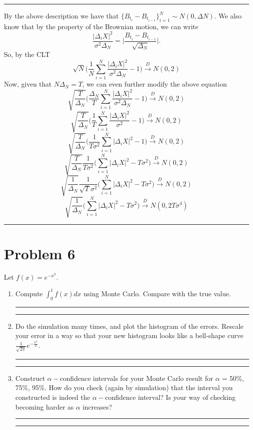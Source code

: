 \documentclass{article} %
\begin{document}
\rule{\textwidth}{1pt}
By the above description we have that $\{B_{t_i} - B_{t_{i-1}} \}_{i=1}^N \sim N(0, \Delta N)$. We also know that by the property of the Brownian motion, we can write 
\[ \frac{|\Delta_i X|^2}{\sigma^2\Delta_N} = \Bigg|\frac{B_{t_i}-B_{t_{i-1}}}{\sqrt{\Delta_N}}\Bigg|.   \]
So, by the CLT
\[  \sqrt{N} \Bigg( \frac{1}{N} \sum_{i=1}^N \frac{|\Delta_i X|^2}{\sigma^2\Delta_N} -1  \Bigg)\xrightarrow[]{D} N(0,2)    \]
Now, given that $N\Delta_N=T$, we can even further modify the above equation
\[  \sqrt{\frac{T}{\Delta_N}} \Bigg( \frac{\Delta_N}{T} \sum_{i=1}^N \frac{|\Delta_i X|^2}{\sigma^2\Delta_N} -1  \Bigg)\xrightarrow[]{D} N(0,2)    \]
\[  \sqrt{\frac{T}{\Delta_N}} \Bigg( \frac{1}{T} \sum_{i=1}^N \frac{|\Delta_i X|^2}{\sigma^2} -1  \Bigg)\xrightarrow[]{D} N(0,2)    \]
\[  \sqrt{\frac{T}{\Delta_N}} \Bigg( \frac{1}{T\sigma^2} \sum_{i=1}^N |\Delta_i X|^2 -1  \Bigg)\xrightarrow[]{D} N(0,2)    \]
\[  \sqrt{\frac{T}{\Delta_N}}  \frac{1}{T\sigma^2} \Bigg( \sum_{i=1}^N |\Delta_i X|^2 -T\sigma^2  \Bigg)\xrightarrow[]{D} N(0,2)    \]
\[  \sqrt{\frac{1}{\Delta_N}}  \frac{1}{\sqrt{T}\sigma^2} \Bigg( \sum_{i=1}^N |\Delta_i X|^2 -T\sigma^2  \Bigg)\xrightarrow[]{D} N(0,2)    \]
\[  \sqrt{\frac{1}{\Delta_N}} \Bigg( \sum_{i=1}^N |\Delta_i X|^2 -T\sigma^2  \Bigg)\xrightarrow[]{D} N(0,2T\sigma^4)    \]
\rule{\textwidth}{1pt}


\section*{Problem 6}
Let $f(x) = e^{-x^3}$.
\begin{enumerate}
\item Compute  $\int_{0}^1f(x)dx$ using Monte Carlo. Compare with the true value.

\rule{\textwidth}{1pt}


\rule{\textwidth}{1pt}
\item Do the simulation many times, and plot the histogram of the errors. Rescale your error in a way so that
your new histogram looks like a bell-shape curve $\frac{1}{\sqrt{2\pi}}e^{-\frac{x^2}{2}}$.

\rule{\textwidth}{1pt}


\rule{\textwidth}{1pt}
\item Construct $\alpha-$confidence intervals for your Monte Carlo result for $\alpha$ = 50\%, 75\%, 95\%. How do you check (again by simulation) that the interval you constructed is indeed the $\alpha-$confidence interval? Is your way of checking becoming harder as $\alpha$ increases?
\rule{\textwidth}{1pt}


\rule{\textwidth}{1pt}
\end{enumerate}
\end{document}
